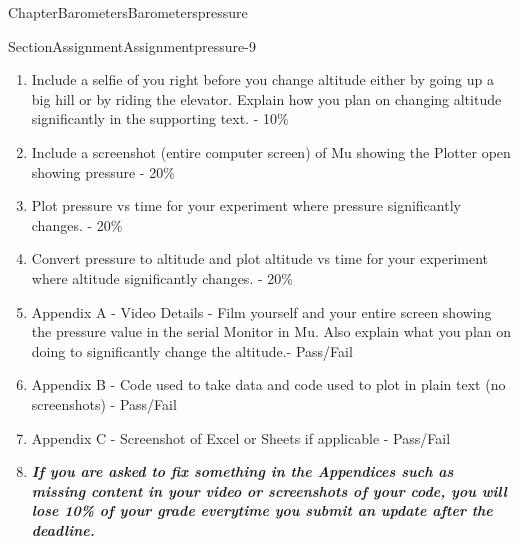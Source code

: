 \documentclass[oneside,10pt,]{book}
\newcommand{\alert}[1]{\textbf{\textit{#1}}}
\numberwithin{equation}{section}
\begin{document}
\begin{chapterptx}{Chapter}{Barometers}{}{Barometers}{}{}{pressure}
\begin{sectionptx}{Section}{Assignment}{}{Assignment}{}{}{pressure-9}
\begin{introduction}{}
\begin{enumerate}
\item{}Include a selfie of you right before you change altitude either by going up a big hill or by riding the elevator. Explain how you plan on changing altitude significantly in the supporting text. - 10\%%
\item{}Include a screenshot (entire computer screen) of Mu showing the Plotter open showing pressure - 20\%%
\item{}Plot pressure vs time for your experiment where pressure significantly changes. - 20\%%
\item{}Convert pressure to altitude and plot altitude vs time for your experiment where altitude significantly changes. - 20\%%
\item{}Appendix A - Video Details - Film yourself and your entire screen showing the pressure value in the serial Monitor in Mu. Also explain what you plan on doing to significantly change the altitude.- Pass\slash{}Fail%
\item{}Appendix B - Code used to take data and code used to plot in plain text (no screenshots) - Pass\slash{}Fail%
\item{}Appendix C - Screenshot of Excel or Sheets if applicable - Pass\slash{}Fail%
\item{}\alert{If you are asked to fix something in the Appendices such as missing content in your video or screenshots of your code, you will lose 10\% of your grade everytime you submit an update after the deadline.}%
\end{enumerate}
\end{introduction}%
\end{sectionptx}
\end{chapterptx}
%
%
\typeout{************************************************}
\typeout{************************************************}
%
\end{document}
